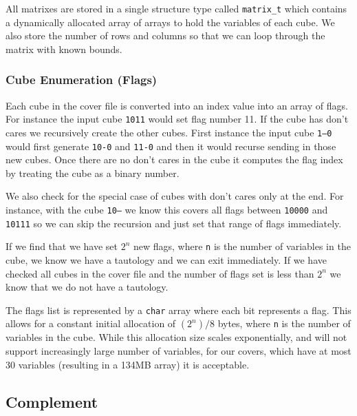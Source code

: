 \documentclass[10pt]{article}
\begin{document}
        All matrixes are stored in a single structure type called
        \texttt{matrix\_t} which contains a dynamically allocated array of
        arrays to hold the variables of each cube. We also store the number of
        rows and columns so that we can loop through the matrix with known
        bounds.

        \subsubsection{Cube Enumeration (Flags)}

        Each cube in the cover file is converted into an index value into an
        array of flags. For instance the input cube \texttt{1011} would set
        flag number 11. If the cube has don't cares we recursively create the
        other cubes. First instance the input cube \texttt{1--0} would first
        generate \texttt{10-0} and \texttt{11-0} and then it would recurse
        sending in those new cubes.  Once there are no don't cares in the cube
        it computes the flag index by treating the cube as a binary number.

        We also check for the special case of cubes with don't cares only at
        the end. For instance, with the cube \texttt{10---} we know this covers
        all flags between \texttt{10000} and \texttt{10111} so we can skip the
        recursion and just set that range of flags immediately.

        If we find that we have set $ 2^n $ new flags, where \texttt{n} is the
        number of variables in the cube, we know we have a tautology and we can
        exit immediately. If we have checked all cubes in the cover file and
        the number of flags set is less than $2^n$ we know that we do not have
        a tautology.

        The flags list is represented by a \texttt{char} array where each bit
        represents a flag. This allows for a constant initial allocation of
        $(2^n)/8$ bytes, where \texttt{n} is the number of variables in the
        cube. While this allocation size scales exponentially, and will not
        support increasingly large number of variables, for our covers, which
        have at most 30 variables (resulting in a 134MB array) it is
        acceptable.

    \subsection{Complement}
\end{document}
